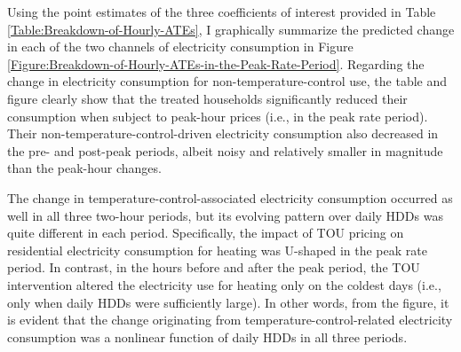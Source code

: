 Using the point estimates of the three coefficients of interest provided in Table \ref{Table:Breakdown-of-Hourly-ATEs}, I graphically summarize the predicted change in each of the two channels of electricity consumption in Figure \ref{Figure:Breakdown-of-Hourly-ATEs-in-the-Peak-Rate-Period}. Regarding the change in electricity consumption for non-temperature-control use, the table and figure clearly show that the treated households significantly reduced their consumption when subject to peak-hour prices (i.e., in the peak rate period). Their non-temperature-control-driven electricity consumption also decreased in the pre- and post-peak periods, albeit noisy and relatively smaller in magnitude than the peak-hour changes. 

The change in temperature-control-associated electricity consumption occurred as well in all three two-hour periods, but its evolving pattern over daily HDDs was quite different in each period. Specifically, the impact of TOU pricing on residential electricity consumption for heating was U-shaped in the peak rate period. In contrast, in the hours before and after the peak period, the TOU intervention altered the electricity use for heating only on the coldest days (i.e., only when daily HDDs were sufficiently large). In other words, from the figure, it is evident that the change originating from temperature-control-related electricity consumption was a nonlinear function of daily HDDs in all three periods.

